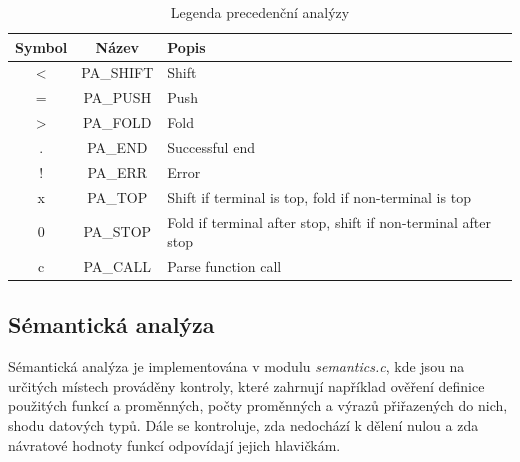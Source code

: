 \documentclass[a4paper, 12pt]{article} %
\begin{document}
                \begin{table}[h]
                    \centering
                    \small
                    \begin{tabular}{|c|c|l|}
                      \hline
                      \textbf{Symbol} & \textbf{Název} & \textbf{Popis}\\
                      \hline
                      \textless & PA\_SHIFT & Shift\\
                      \hline
                      = & PA\_PUSH & Push \\
                      \hline
                      \textgreater & PA\_FOLD & Fold \\
                      \hline
                      . & PA\_END & Successful end\\
                      \hline
                      ! & PA\_ERR  & Error\\
                      \hline
                      x & PA\_TOP &  Shift if terminal is top, fold if non-terminal is top\\
                      \hline
                      0 & PA\_STOP & Fold if terminal after stop, shift if non-terminal after stop\\
                      \hline
                      c & PA\_CALL & Parse function call\\
                      \hline
                    \end{tabular}
                    \caption{Legenda precedenční analýzy}
                    \label{tab:tabulka}
                  \end{table}

        \subsection{Sémantická analýza} \label{semantics}
            Sémantická analýza je implementována v modulu \textit{semantics.c}, kde jsou 
            na určitých místech prováděny kontroly, které zahrnují například 
            ověření definice použitých funkcí a proměnných, počty proměnných a výrazů přiřazených 
            do nich, shodu datových typů. Dále se kontroluje, zda nedochází k dělení nulou a zda 
            návratové hodnoty funkcí odpovídají jejich hlavičkám. 
            
\end{document}
